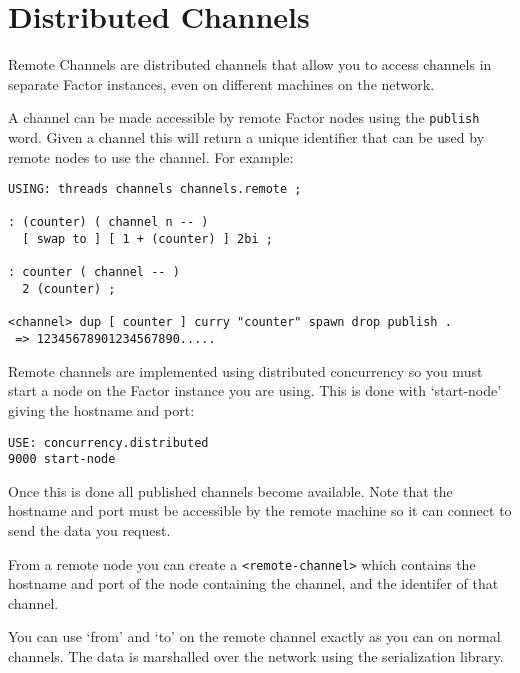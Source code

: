 \chapter{Distributed Channels}\label{dchannels}

Remote Channels are distributed channels that allow you to access
channels in separate Factor instances, even on different machines on
the network. 


A channel can be made accessible by remote Factor nodes using the
\texttt{publish} word. Given a channel this will return a unique
identifier that can be used by remote nodes to use the channel. For
example:

\begin{verbatim}
USING: threads channels channels.remote ;

: (counter) ( channel n -- )
  [ swap to ] [ 1 + (counter) ] 2bi ;
    
: counter ( channel -- )
  2 (counter) ;    

<channel> dup [ counter ] curry "counter" spawn drop publish .
 => 12345678901234567890.....
\end{verbatim}

Remote channels are implemented using
distributed concurrency so you must start a node on the Factor
instance you are using. This is done with `start-node' giving the
hostname and port:


\begin{verbatim}
USE: concurrency.distributed
9000 start-node
\end{verbatim}

Once this is done all published channels become available. Note that
the hostname and port must be accessible by the remote machine so it
can connect to send the data you request.

From a remote node you can create a \texttt{<remote-channel>} which contains
the hostname and port of the node containing the channel, and the identifer
of that channel.

You can use `from' and `to' on the remote channel exactly as you can
on normal channels. The data is marshalled over the network using the
serialization library.  

